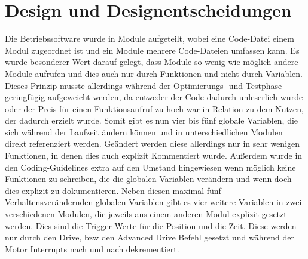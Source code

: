 \chapter{Design und Designentscheidungen}
Die Betriebssoftware wurde in Module aufgeteilt, wobei eine Code-Datei einem
Modul zugeordnet ist und ein Module mehrere Code-Dateien umfassen kann.
Es wurde besonderer Wert darauf gelegt, dass Module so wenig wie möglich andere
Module aufrufen und dies auch nur durch Funktionen und nicht durch Variablen.
Dieses Prinzip musste allerdings während der Optimierungs- und Testphase
geringfügig aufgeweicht werden, da entweder der Code dadurch unleserlich wurde
oder der Preis für einen Funktionsaufruf zu hoch war in Relation zu dem
Nutzen, der dadurch erzielt wurde.
Somit gibt es nun vier bis fünf globale Variablen, die sich während der Laufzeit
ändern können und in unterschiedlichen Modulen direkt referenziert werden.
Geändert werden diese allerdings nur in sehr wenigen Funktionen, in denen dies
auch explizit Kommentiert wurde. Außerdem wurde in den Coding-Guidelines extra
auf den Umstand hingewiesen wenn möglich keine Funktionen zu schreiben, die die
globalen Variablen verändern und wenn doch dies explizit zu dokumentieren.
Neben diesen maximal fünf Verhaltensverändernden globalen Variablen gibt es vier
weitere Variablen in zwei verschiedenen Modulen, die jeweils aus einem anderen
Modul explizit gesetzt werden. Dies sind die Trigger-Werte für die Position und
die Zeit. Diese werden nur durch den Drive, bzw den Advanced Drive Befehl
gesetzt und während der Motor Interrupts nach und nach dekrementiert.
